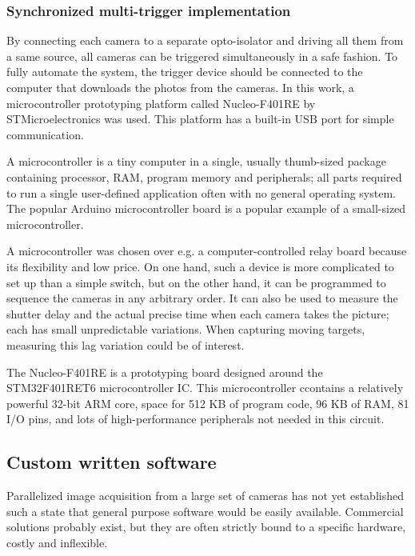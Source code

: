 

\subsubsection{Synchronized multi-trigger implementation} %

By connecting each camera to a separate opto-isolator and driving all them from a same source, all cameras can be triggered simultaneously in a safe fashion.
To fully automate the system, the trigger device should be connected to the computer that downloads the photos from the cameras.
In this work, a microcontroller prototyping platform called Nucleo-F401RE by STMicroelectronics was used.
This platform has a built-in USB port for simple communication.

A microcontroller is a tiny computer in a single, usually thumb-sized package containing processor, RAM, program memory and peripherals; all parts required to run a single user-defined application often with no general operating system.
The popular Arduino microcontroller board is a popular example of a small-sized microcontroller.

A microcontroller was chosen over e.g. a computer-controlled relay board because its flexibility and low price.
On one hand, such a device is more complicated to set up than a simple switch, but on the other hand, it can be programmed to sequence the cameras in any arbitrary order.
It can also be used to measure the shutter delay and the actual precise time when each camera takes the picture; each has small unpredictable variations.
When capturing moving targets, measuring this lag variation could be of interest.

The Nucleo-F401RE is a prototyping board designed around the STM32F401RET6 microcontroller IC.
This microcontroller ccontains a relatively powerful 32-bit ARM core, space for 512 KB of program code, 96 KB of RAM, 81 I/O pins, and lots of high-performance peripherals not needed in this circuit.


\subsection{Custom written software} %

Parallelized image acquisition from a large set of cameras has not yet established such a state that general purpose software would be easily available.
Commercial solutions probably exist, but they are often strictly bound to a specific hardware, costly and inflexible.

